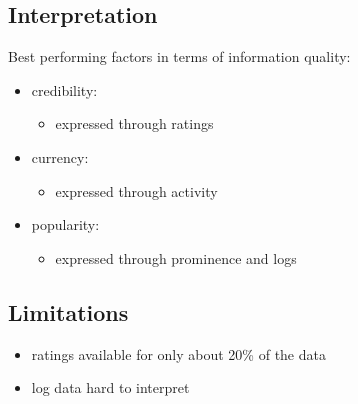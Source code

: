 \documentclass[xcolor={svgnames}]{beamer}
\makeatletter
\newcommand*{\currentname}{\@currentlabelname}
\makeatother
\begin{document}
\subsection{Interpretation}
\begin{frame}{\currentname}\linespread{1.5}
  Best performing factors in terms of information quality:
  \begin{itemize}
    \item credibility:
    \begin{itemize}
      \item expressed through ratings
    \end{itemize}
    \item currency:
    \begin{itemize}
      \item expressed through activity
    \end{itemize}
    \item popularity:
      \begin{itemize}
        \item expressed through prominence and logs
      \end{itemize}
  \end{itemize}
\end{frame}

\subsection{Limitations}
\begin{frame}{\currentname}\linespread{1.5}
    \begin{itemize}
        \item ratings available for only about 20\% of the data
        \item log data hard to interpret
    \end{itemize}
\end{frame}

%
\end{document}
